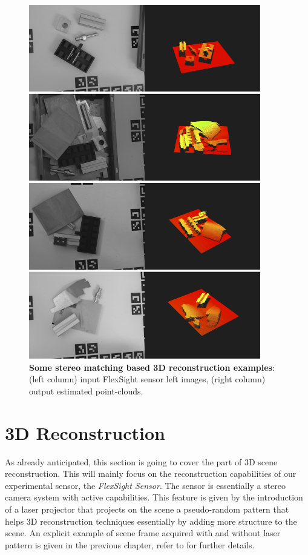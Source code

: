 \begin{figure}[!hbt]
    \centering
    \includegraphics[width=0.9\textwidth]{figures/4_experiments/3d_reconst_ex}
    \caption{\textbf{Some stereo matching based 3D reconstruction examples}: (left column) input FlexSight sensor left images, (right column) output estimated point-clouds.}
    \label{fig:3d_reconst_ex}
\end{figure}

\section{3D Reconstruction}\label{sec:exp_3d_reconstruction}
As already anticipated, this section is going to cover the part of 3D scene reconstruction. This will mainly focus on the reconstruction capabilities of our experimental sensor, the \emph{FlexSight Sensor}. The sensor is essentially a stereo camera system with active capabilities. This feature is given by the introduction of a laser projector that projects on the scene a pseudo-random pattern that helps 3D reconstruction techniques essentially by adding more structure to the scene. An explicit example of scene frame acquired with and without laser pattern is given in the previous chapter, refer to  for further details.

